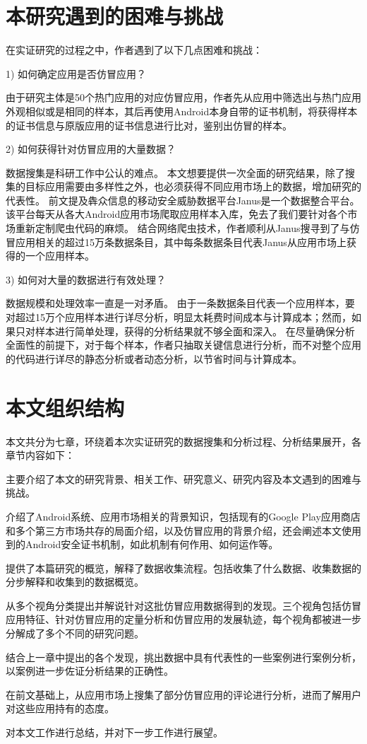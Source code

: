\section{本研究遇到的困难与挑战}
在实证研究的过程之中，作者遇到了以下几点困难和挑战：

1)	如何确定应用是否仿冒应用？

由于研究主体是50个热门应用的对应仿冒应用，作者先从应用中筛选出与热门应用外观相似或是相同的样本，其后再使用Android本身自带的证书机制，将获得样本的证书信息与原版应用的证书信息进行比对，鉴别出仿冒的样本。

2)	如何获得针对仿冒应用的大量数据？

数据搜集是科研工作中公认的难点。
本文想要提供一次全面的研究结果，除了搜集的目标应用需要由多样性之外，也必须获得不同应用市场上的数据，增加研究的代表性。
前文提及犇众信息的移动安全威胁数据平台Janus是一个数据整合平台。该平台每天从各大Android应用市场爬取应用样本入库，免去了我们要针对各个市场重新定制爬虫代码的麻烦。
结合网络爬虫技术，作者顺利从Janus搜寻到了与仿冒应用相关的超过15万条数据条目，其中每条数据条目代表Janus从应用市场上获得的一个应用样本。

3)	如何对大量的数据进行有效处理？

数据规模和处理效率一直是一对矛盾。
由于一条数据条目代表一个应用样本，要对超过15万个应用样本进行详尽分析，明显太耗费时间成本与计算成本；然而，如果只对样本进行简单处理，获得的分析结果就不够全面和深入。
在尽量确保分析全面性的前提下，对于每个样本，作者只抽取关键信息进行分析，而不对整个应用的代码进行详尽的静态分析或者动态分析，以节省时间与计算成本。


\section{本文组织结构}
本文共分为七章，环绕着本次实证研究的数据搜集和分析过程、分析结果展开，各章节内容如下：

 主要介绍了本文的研究背景、相关工作、研究意义、研究内容及本文遇到的困难与挑战。

 介绍了Android系统、应用市场相关的背景知识，包括现有的Google Play应用商店和多个第三方市场共存的局面介绍，以及仿冒应用的背景介绍，还会阐述本文使用到的Android安全证书机制，如此机制有何作用、如何运作等。

 提供了本篇研究的概览，解释了数据收集流程。包括收集了什么数据、收集数据的分步解释和收集到的数据概览。

 从多个视角分类提出并解说针对这批仿冒应用数据得到的发现。三个视角包括仿冒应用特征、针对仿冒应用的定量分析和仿冒应用的发展轨迹，每个视角都被进一步分解成了多个不同的研究问题。

 结合上一章中提出的各个发现，挑出数据中具有代表性的一些案例进行案例分析，以案例进一步佐证分析结果的正确性。

 在前文基础上，从应用市场上搜集了部分仿冒应用的评论进行分析，进而了解用户对这些应用持有的态度。

 对本文工作进行总结，并对下一步工作进行展望。
